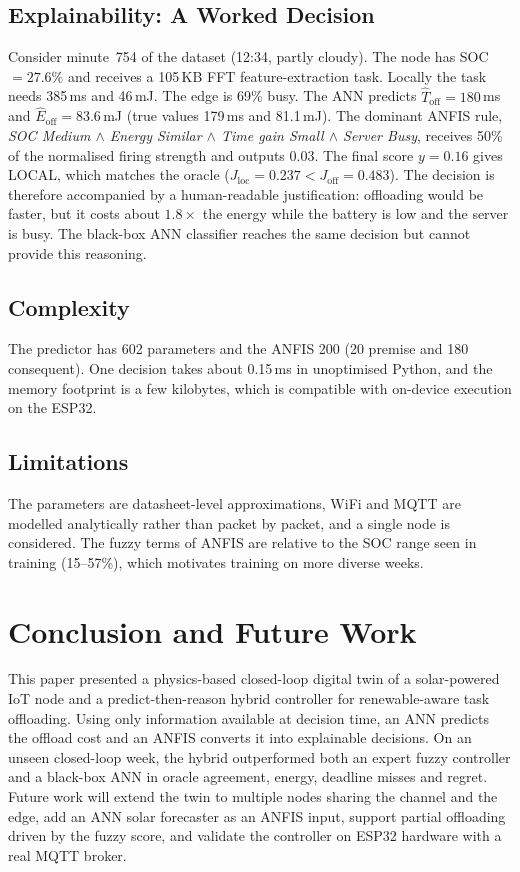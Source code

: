 \documentclass[conference]{IEEEtran}
\newcommand{\Jl}{J_{\mathrm{loc}}}
\newcommand{\Jo}{J_{\mathrm{off}}}
\begin{document}
\subsection{Explainability: A Worked Decision}
Consider minute~754 of the dataset (12:34, partly cloudy). The node has SOC $=27.6\%$ and receives a 105\,KB FFT feature-extraction
task. Locally the task needs 385\,ms and 46\,mJ. The edge is 69\% busy. The ANN predicts $\hat T_{\mathrm{off}}=180$\,ms and
$\hat E_{\mathrm{off}}=83.6$\,mJ (true values 179\,ms and 81.1\,mJ). The dominant ANFIS rule, \emph{SOC Medium $\wedge$ Energy Similar
$\wedge$ Time gain Small $\wedge$ Server Busy}, receives 50\% of the normalised firing strength and outputs 0.03. The final score
$y=0.16$ gives LOCAL, which matches the oracle ($\Jl=0.237<\Jo=0.483$). The decision is therefore accompanied by a human-readable
justification: offloading would be faster, but it costs about $1.8\times$ the energy while the battery is low and the server is busy.
The black-box ANN classifier reaches the same decision but cannot provide this reasoning.

\subsection{Complexity}
The predictor has 602 parameters and the ANFIS 200 (20 premise and 180 consequent). One decision takes about 0.15\,ms in
unoptimised Python, and the memory footprint is a few kilobytes, which is compatible with on-device execution on the ESP32.

\subsection{Limitations}
The parameters are datasheet-level approximations, WiFi and MQTT are modelled analytically rather than packet by packet, and a single
node is considered. The fuzzy terms of ANFIS are relative to the SOC range seen in training (15--57\%), which motivates training on
more diverse weeks.

\section{Conclusion and Future Work}
This paper presented a physics-based closed-loop digital twin of a solar-powered IoT node and a predict-then-reason hybrid controller
for renewable-aware task offloading. Using only information available at decision time, an ANN predicts the offload cost and an ANFIS
converts it into explainable decisions. On an unseen closed-loop week, the hybrid outperformed both an expert fuzzy controller and a
black-box ANN in oracle agreement, energy, deadline misses and regret. Future work will extend the twin to multiple nodes sharing the
channel and the edge, add an ANN solar forecaster as an ANFIS input, support partial offloading driven by the fuzzy score, and
validate the controller on ESP32 hardware with a real MQTT broker.
\end{document}
